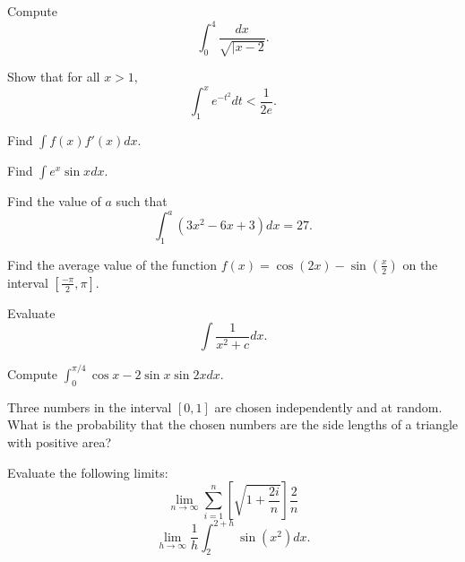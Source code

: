 \documentclass{article}
\begin{document}
\problems



\begin{prob}[SMT 2018/4]{2}
Compute
\[\int_0^4\frac{dx}{\sqrt{|x-2}}.\]
\end{prob}

\begin{prob}{2}
Show that for all $x>1,$
\[\int_{1}^x e^{-t^2}dt<\frac{1}{2e}.\]
\end{prob}

\begin{req}{2}
Find $\int f(x)f'(x)dx.$
\end{req}

\begin{req}{3}
Find $\int e^x\sin xdx.$
\end{req}

\begin{prob}[SMT 2018/3]{3}
Find the value of $a$ such that
\[\int_1^a\left(3x^2-6x+3\right)dx=27.\]
\end{prob}

\begin{prob}{3}
Find the average value of the function $f(x)=\cos(2x)-\sin(\frac{x}{2})$ on the interval $[\frac{-\pi}{2},\pi]$.
\end{prob}

\begin{prob}{4}
Evaluate
\[\int \frac{1}{x^2+c}dx.\]
\end{prob}

\begin{prob}[SMT 2019/3]{4}
Compute $\int_0^{\pi/4}\cos x-2\sin x\sin 2x dx.$
\end{prob}

\begin{req}[AMC 12A 2016/23]{4}
Three numbers in the interval $[0,1]$ are chosen independently and at random. What is the probability that the chosen numbers are the side lengths of a triangle with positive area?
\end{req}

\begin{prob}{6}
Evaluate the following limits:
	\[\lim_{n \to \infty} \sum_{i = 1}^n\left[\sqrt{1+\frac{2i}{n}}\right]\frac{2}{n}\]
	\[\lim_{h \to \infty} \frac{1}{h}\int_{2}^{2+h}\sin(x^2)dx.\]
\end{prob}
\end{document}
